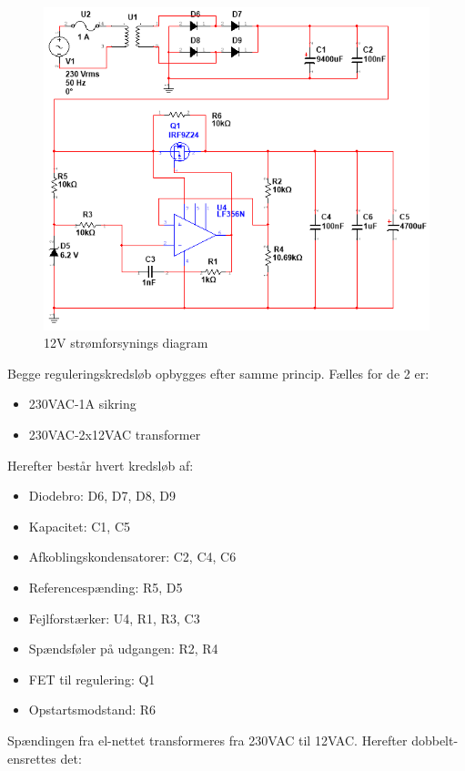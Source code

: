 \begin{figure}[H]
	\centering
	\includegraphics[scale=0.75]{../Hardware/PSU/PSU_12V}
	\caption{12V strømforsynings diagram}
	\label{photo:PSU_12V}
\end{figure}

Begge reguleringskredsløb opbygges efter samme princip. Fælles for de 2 er:
\begin{itemize}
\item 230VAC-1A sikring
\item 230VAC-2x12VAC transformer
\end{itemize}

Herefter består hvert kredsløb af:
\begin{itemize}
\item Diodebro: D6, D7, D8, D9
\item Kapacitet: C1, C5
\item Afkoblingskondensatorer: C2, C4, C6
\item Referencespænding: R5, D5
\item Fejlforstærker: U4, R1, R3, C3
\item Spændsføler på udgangen: R2, R4
\item FET til regulering: Q1
\item Opstartsmodstand: R6
\end{itemize}

Spændingen fra el-nettet transformeres fra 230VAC til 12VAC. Herefter dobbelt-ensrettes det:

